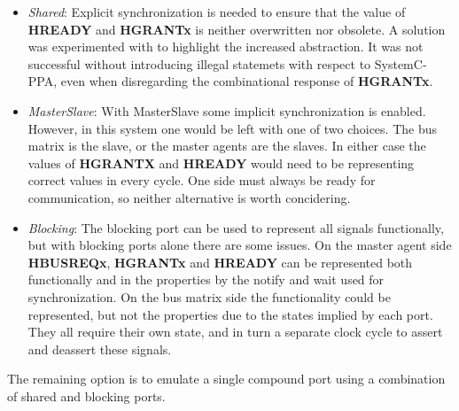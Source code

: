 \begin{itemize}
 \item \textit{Shared}: Explicit synchronization is needed to ensure that the value of \textbf{HREADY} and \textbf{HGRANTx} is neither overwritten nor obsolete. A solution was experimented with to highlight the increased abstraction. It was not successful without introducing illegal statemets with respect to SystemC-PPA, even when disregarding the combinational response of \textbf{HGRANTx}.   
 \item \textit{MasterSlave}: With MasterSlave some implicit synchronization is enabled. However, in this system one would be left with one of two choices. The bus matrix is the slave, or the master agents are the slaves. In either case the values of \textbf{HGRANTX} and \textbf{HREADY} would need to be representing correct values in every cycle. One side must always be ready for communication, so neither alternative is worth concidering.  
 \item \textit{Blocking}: The blocking port can be used to represent all signals functionally, but with blocking ports alone there are some issues. On the master agent side \textbf{HBUSREQx}, \textbf{HGRANTx} and \textbf{HREADY} can be represented both functionally and in the properties by the notify and wait used for synchronization. On the bus matrix side the functionality could be represented, but not the properties due to the states implied by each port. They all require their own state, and in turn a separate clock cycle to assert and deassert these signals.
\end{itemize}

The remaining option is to emulate a single compound port using a combination of shared and blocking ports.

